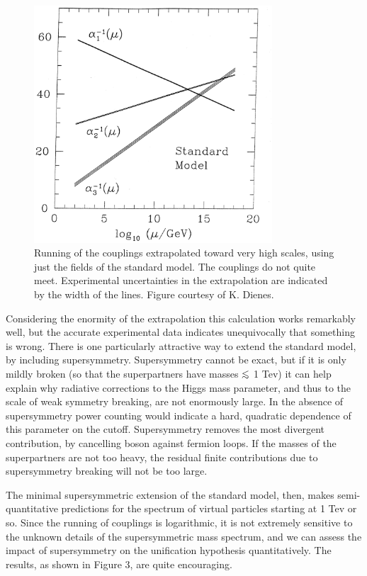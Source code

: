 \documentclass[12pt]{article}
\def\lsim{\mathrel{\raise.3ex\hbox{$<$}\mkern-14mu
             \lower0.6ex\hbox{$\sim$}}}
\begin{document}
\begin{figure}
\centerline{\includegraphics[width=3.5in]{cosmo6.pdf}}

\caption{Running of the couplings
extrapolated toward very high scales, using just the fields of the
standard model.  The couplings do not quite meet.  Experimental
uncertainties in the extrapolation are indicated by the width of the
lines. Figure courtesy of K. Dienes.}
\label{fig2}
\end{figure}


Considering the enormity of the extrapolation this calculation works 
remarkably well, but the accurate experimental data indicates
unequivocally that something is wrong.  There is one particularly
attractive way to extend the standard model, by including
supersymmetry.  Supersymmetry cannot be exact, but if it is only
mildly broken (so that the superpartners have masses $\lsim$ 1 Tev) it
can help explain why radiative corrections to the Higgs mass
parameter, and thus to the scale of weak symmetry breaking, are not
enormously large.  In the absence of supersymmetry power counting
would indicate a hard, quadratic dependence of this parameter on the
cutoff.  Supersymmetry removes the most divergent contribution, by
cancelling boson against fermion loops.  If the masses of the
superpartners are not too heavy, the residual finite contributions due
to supersymmetry breaking will not be too large.  

The minimal
supersymmetric extension of the standard model, then, 
makes semi-quantitative
predictions for the spectrum of virtual particles starting at 1 Tev or
so.  Since the running of couplings is logarithmic, it is not
extremely sensitive to the unknown details of the supersymmetric mass
spectrum, and we can assess the impact of supersymmetry on the
unification hypothesis quantitatively.  The results, as shown in
Figure 3, are quite encouraging.  
\end{document}
